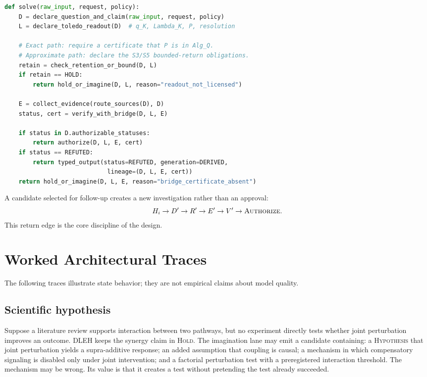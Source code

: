 \documentclass[10pt,twocolumn]{article}
\begin{document}
\begin{lstlisting}[language=Python,caption={Minimal dual-lane control loop.},label={lst:loop}]
def solve(raw_input, request, policy):
    D = declare_question_and_claim(raw_input, request, policy)
    L = declare_toledo_readout(D)  # q_K, Lambda_K, P, resolution

    # Exact path: require a certificate that P is in Alg_Q.
    # Approximate path: declare the S3/S5 bounded-return obligations.
    retain = check_retention_or_bound(D, L)
    if retain == HOLD:
        return hold_or_imagine(D, L, reason="readout_not_licensed")

    E = collect_evidence(route_sources(D), D)
    status, cert = verify_with_bridge(D, L, E)

    if status in D.authorizable_statuses:
        return authorize(D, L, E, cert)
    if status == REFUTED:
        return typed_output(status=REFUTED, generation=DERIVED,
                             lineage=(D, L, E, cert))
    return hold_or_imagine(D, L, E, reason="bridge_certificate_absent")
\end{lstlisting}

A candidate selected for follow-up creates a new investigation rather than an approval:
\begin{equation}
H_i \to D' \to R' \to E' \to V' \to \textsc{Authorize}.
\end{equation}
This return edge is the core discipline of the design.

\section{Worked Architectural Traces}
The following traces illustrate state behavior; they are not empirical claims about model quality.

\subsection{Scientific hypothesis}
Suppose a literature review supports interaction between two pathways, but no experiment directly tests whether joint perturbation improves an outcome. DLEH keeps the synergy claim in \textsc{Hold}. The imagination lane may emit a candidate containing: a \textsc{Hypothesis} that joint perturbation yields a supra-additive response; an added assumption that coupling is causal; a mechanism in which compensatory signaling is disabled only under joint intervention; and a factorial perturbation test with a preregistered interaction threshold. The mechanism may be wrong. Its value is that it creates a test without pretending the test already succeeded.
\end{document}
